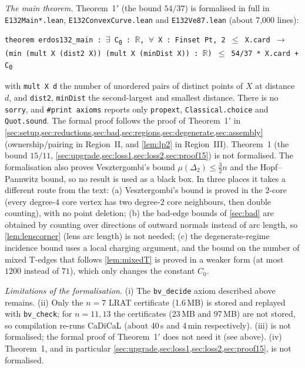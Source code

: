 \documentclass[11pt]{amsart}
\theoremstyle{definition}
\theoremstyle{remark}
\newcommand{\R}{\mathbb{R}}
\newcommand{\Dt}{\Delta_2}
\newcommand{\mult}{\mu}
\begin{document}
\emph{The main theorem.} Theorem~1$'$ (the bound $54/37$) is formalised in full in \texttt{E132Main*.lean}, \texttt{E132ConvexCurve.lean} and \texttt{E132Ve87.lean} (about 7{,}000 lines):
\begin{center}
\texttt{theorem erdos132\_main : $\exists$ C\textsubscript{0} : $\R$, $\forall$ X : Finset Pt, 2 $\le$ X.card $\to$ (min (mult X (dist2 X)) (mult X (minDist X)) : $\R$) $\le$ 54/37 * X.card + C\textsubscript{0}}
\end{center}
with \texttt{mult X d} the number of unordered pairs of distinct points of $X$ at distance $d$, and \texttt{dist2}, \texttt{minDist} the second-largest and smallest distance. There is no \texttt{sorry}, and \texttt{\#print\allowbreak{} axioms} reports only \texttt{propext}, \texttt{Classical.choice} and \texttt{Quot.sound}. The formal proof follows the proof of Theorem~1$'$ in \cref{sec:setup,sec:reductions,sec:bad,sec:regions,sec:degenerate,sec:assembly} (ownership/pairing in Region~II, and \cref{lem:lp2} in Region~III). Theorem~1 (the bound $15/11$, \cref{sec:upgrade,sec:loss1,sec:loss2,sec:proof15}) is not formalised. The formalisation also proves Vesztergombi's bound $\mult(\Dt)\le\frac32n$ and the Hopf--Pannwitz bound, so no result is used as a black box. In three places it takes a different route from the text: (a) Vesztergombi's bound is proved in the $2$-core (every degree-$4$ core vertex has two degree-$2$ core neighbours, then double counting), with no point deletion; (b) the bad-edge bounds of \cref{sec:bad} are obtained by counting over directions of outward normals instead of arc length, so \cref{lem:lenscorner} (lens arc length) is not needed; (c) the degenerate-regime incidence bound uses a local charging argument, and the bound on the number of mixed T-edges that follows \cref{lem:mixedT} is proved in a weaker form (at most $1200$ instead of $71$), which only changes the constant $C_0$.

\emph{Limitations of the formalisation.} (i) The \texttt{bv\_decide} axiom described above remains. (ii) Only the $n=7$ LRAT certificate (1.6\,MB) is stored and replayed with \texttt{bv\_check}; for $n=11,13$ the certificates (23\,MB and 97\,MB) are not stored, so compilation re-runs CaDiCaL (about 40\,s and 4\,min respectively). (iii)  is not formalised; the formal proof of Theorem~1$'$ does not need it (see above). (iv) Theorem~1, and in particular \cref{sec:upgrade,sec:loss1,sec:loss2,sec:proof15}, is not formalised.
\end{document}
